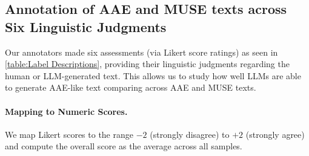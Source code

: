\subsection{Annotation of AAE and MUSE texts across Six Linguistic Judgments}
Our annotators made six assessments (via Likert score ratings) as seen in \autoref{table:Label Descriptions}, providing their linguistic judgments regarding the human or LLM-generated text. This allows us to study how well LLMs are able to generate AAE-like text comparing across AAE and MUSE texts.





\paragraph{Mapping to Numeric Scores.}
We map Likert scores to the range $-2$ (strongly disagree) to $+2$ (strongly agree) and compute the overall score as the average across all samples. 

